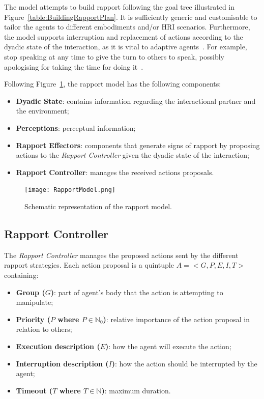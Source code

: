 The model attempts to build rapport following the goal tree illustrated in Figure~\ref{table:BuildingRapportPlan}. It is sufficiently generic and customisable to tailor the agents to different embodiments and/or \ac{HRI} scenarios. Furthermore, the model supports interruption and replacement of actions according to the dyadic state of the interaction, as it is vital to adaptive agents~\cite{Reidsma2011, Visser2014, Kopp2007, Zwiers2011}. For example, stop speaking at any time to give the turn to others to speak, possibly apologising for taking the time for doing it~\cite{Buschmeier2011}. %

Following Figure~\ref{fig:rapportModel}, the rapport model has the following components:
\begin{itemize}
    \item \textbf{Dyadic State}: contains information regarding the interactional partner and the environment;
    \item \textbf{Perceptions}: perceptual information;
    \item \textbf{Rapport Effectors}: components that generate signs of rapport by proposing actions to the \textit{Rapport Controller} given the dyadic state of the interaction;
    \item \textbf{Rapport Controller}: manages the received actions proposals.
\end{itemize}

\begin{figure}[H]
	\centering
    \texttt{[image: RapportModel.png]}
    \caption{Schematic representation of the rapport model.}
    \label{fig:rapportModel}
\end{figure}

\subsection{Rapport Controller}
\label{sub:sec:modelRapportController}

The \textit{Rapport Controller} manages the proposed actions sent by the different rapport strategies. Each action proposal is a quintuple $A= <G,P,E,I,T>$ containing:

\begin{itemize}
    \item \textbf{Group ($G$)}: part of agent's body that the action is attempting to manipulate;
    \item \textbf{Priority ($P$ where $P \in \mathbb{N}_0$)}: relative importance of the action proposal in relation to others; 
    \item \textbf{Execution description ($E$)}: how the agent will execute the action;
    \item \textbf{Interruption description ($I$)}: how the action should be interrupted by the agent;
    \item \textbf{Timeout ($T$ where $T \in \mathbb{N}$)}: maximum duration.%
\end{itemize}

